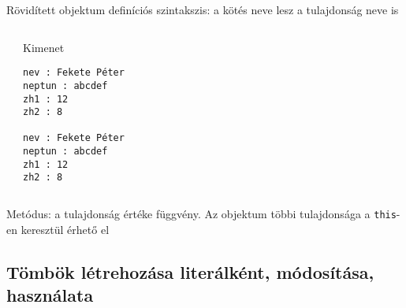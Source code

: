 \begin{frame}[fragile]
  Rövidített objektum definíciós szintakszis: a kötés neve lesz a tulajdonság neve is
  \scriptsize
  \begin{columns}[T]
      \begin{exampleblock}{}
        
      \end{exampleblock}
      \begin{block}{Kimenet}
        \begin{verbatim}
nev : Fekete Péter
neptun : abcdef
zh1 : 12
zh2 : 8

nev : Fekete Péter
neptun : abcdef
zh1 : 12
zh2 : 8
\end{verbatim}
      \end{block}
  \end{columns}
\end{frame}

\begin{frame}
  Metódus: a tulajdonság értéke függvény. Az objektum többi tulajdonsága a \texttt{this}-en keresztül érhető el
  \vfill
  \small
  \begin{exampleblock}{}
    
  \end{exampleblock}
\end{frame}

\begin{frame}
  \begin{exampleblock}{}
    
  \end{exampleblock}
\end{frame}

\subsection{Tömbök létrehozása literálként, módosítása, használata}

